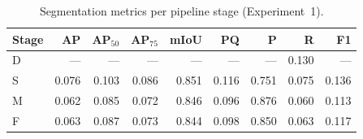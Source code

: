 \begin{table}[t]
\centering
\caption{Segmentation metrics per pipeline stage (Experiment~1).}
\label{tab:exp1-per-stage}
\begin{tabular}{lrrrrrrrr}
\toprule
Stage & AP & AP$_{50}$ & AP$_{75}$ & mIoU & PQ & P & R & F1 \\
\midrule
D & --- & --- & --- & --- & --- & --- & 0.130 & --- \\
S & 0.076 & 0.103 & 0.086 & 0.851 & 0.116 & 0.751 & 0.075 & 0.136 \\
M & 0.062 & 0.085 & 0.072 & 0.846 & 0.096 & 0.876 & 0.060 & 0.113 \\
F & 0.063 & 0.087 & 0.073 & 0.844 & 0.098 & 0.850 & 0.063 & 0.117 \\
\bottomrule
\end{tabular}
\end{table}